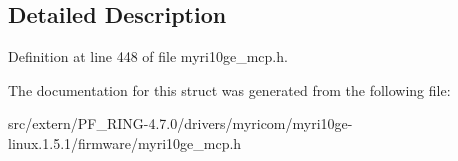 \subsection{Detailed Description}


Definition at line 448 of file myri10ge\_\-mcp.h.



The documentation for this struct was generated from the following file:\begin{DoxyCompactItemize}
\item 
src/extern/PF\_\-RING-\/4.7.0/drivers/myricom/myri10ge-\/linux.1.5.1/firmware/myri10ge\_\-mcp.h\end{DoxyCompactItemize}

